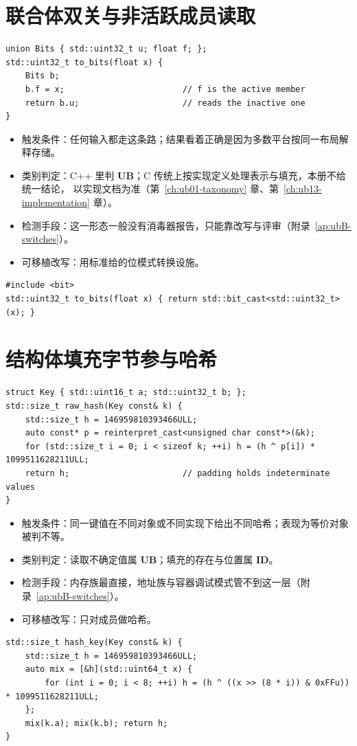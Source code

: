 \documentclass[12pt,a4paper,fontset=fandol]{ctexbook}
\newcommand{\Lang}[1]{\textsf{#1}}
\newcommand{\CL}{\Lang{C}}
\newcommand{\CPP}{\Lang{C++}}
\newcommand{\UB}{\textbf{\textsf{UB}}}
\newcommand{\IDB}{\textbf{\textsf{ID}}}
\begin{document}
\section{联合体双关与非活跃成员读取}
\begin{lstlisting}[style=cppstyle, caption={反例：写入一个成员，读取另一个成员}]
union Bits { std::uint32_t u; float f; };
std::uint32_t to_bits(float x) {
    Bits b;
    b.f = x;                        // f is the active member
    return b.u;                     // reads the inactive one
}
\end{lstlisting}
\begin{itemize}
\item 触发条件：任何输入都走这条路；结果看着正确是因为多数平台按同一布局解释存储。
\item 类别判定：\CPP{} 里判 \UB{}；\CL{} 传统上按实现定义处理表示与填充，本册不给统一结论，
以实现文档为准（第~\ref{ch:ub01-taxonomy} 章、第~\ref{ch:ub13-implementation} 章）。
\item 检测手段：这一形态一般没有消毒器报告，只能靠改写与评审（附录~\ref{ap:ubB-switches}）。
\item 可移植改写：用标准给的位模式转换设施。
\end{itemize}
\begin{lstlisting}[style=cppstyle, caption={改写：显式且可移植的表示转换}]
#include <bit>
std::uint32_t to_bits(float x) { return std::bit_cast<std::uint32_t>(x); }
\end{lstlisting}

\section{结构体填充字节参与哈希}
\begin{lstlisting}[style=cppstyle, caption={反例：对含填充的对象逐字节哈希}]
struct Key { std::uint16_t a; std::uint32_t b; };
std::size_t raw_hash(Key const& k) {
    std::size_t h = 146959810393466ULL;
    auto const* p = reinterpret_cast<unsigned char const*>(&k);
    for (std::size_t i = 0; i < sizeof k; ++i) h = (h ^ p[i]) * 1099511628211ULL;
    return h;                       // padding holds indeterminate values
}
\end{lstlisting}
\begin{itemize}
\item 触发条件：同一键值在不同对象或不同实现下给出不同哈希；表现为等价对象被判不等。
\item 类别判定：读取不确定值属 \UB{}；填充的存在与位置属 \IDB{}。
\item 检测手段：内存族最直接，地址族与容器调试模式管不到这一层（附录~\ref{ap:ubB-switches}）。
\item 可移植改写：只对成员做哈希。
\end{itemize}
\begin{lstlisting}[style=cppstyle, caption={改写：逐字段混合，跳过对象表示}]
std::size_t hash_key(Key const& k) {
    std::size_t h = 146959810393466ULL;
    auto mix = [&h](std::uint64_t x) {
        for (int i = 0; i < 8; ++i) h = (h ^ ((x >> (8 * i)) & 0xFFu)) * 1099511628211ULL;
    };
    mix(k.a); mix(k.b); return h;
}
\end{lstlisting}
\end{document}
